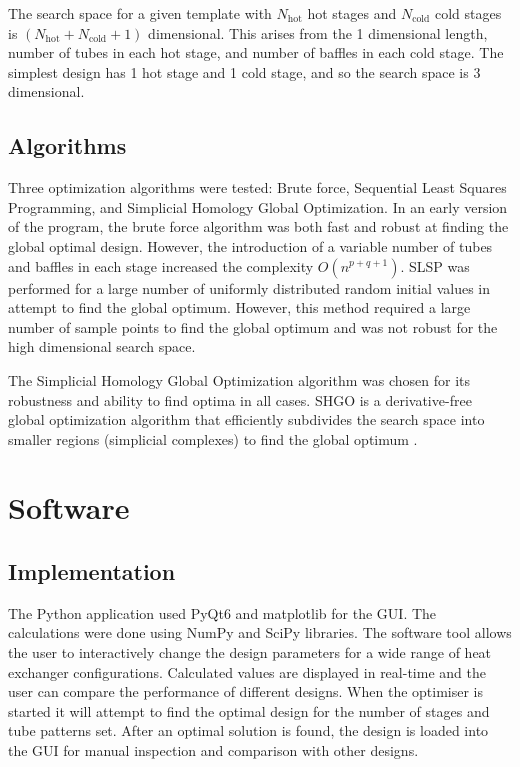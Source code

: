 \documentclass{article}
\begin{document}
The search space for a given template with $N_\text{hot}$ hot stages and $N_\text{cold}$ cold stages is $(N_\text{hot} + N_\text{cold} + 1)$ dimensional.
This arises from the 1 dimensional length, number of tubes in each hot stage, and number of baffles in each cold stage.
The simplest design has 1 hot stage and 1 cold stage, and so the search space is 3 dimensional.

\subsection{Algorithms}
Three optimization algorithms were tested: Brute force, Sequential Least Squares Programming, and Simplicial Homology Global Optimization.
In an early version of the program, the brute force algorithm was both fast and robust at finding the global optimal design.
However, the introduction of a variable number of tubes and baffles in each stage increased the complexity $O(n^{p+q+1})$.
SLSP was performed for a large number of uniformly distributed random initial values in attempt to find the global optimum.
However, this method required a large number of sample points to find the global optimum and was not robust for the high dimensional search space.

The Simplicial Homology Global Optimization algorithm was chosen for its robustness and ability to find optima in all cases.
SHGO is a derivative-free global optimization algorithm that efficiently subdivides the search space into smaller regions (simplicial complexes) to find the global optimum \cite{SHGO}.

\section{Software}

\subsection{Implementation}

The Python application used PyQt6 and matplotlib for the GUI. The calculations were done using NumPy and SciPy libraries.
The software tool allows the user to interactively change the design parameters for a wide range of heat exchanger configurations.
Calculated values are displayed in real-time and the user can compare the performance of different designs.
When the optimiser is started it will attempt to find the optimal design for the number of stages and tube patterns set.
After an optimal solution is found, the design is loaded into the GUI for manual inspection and comparison with other designs.
\end{document}
